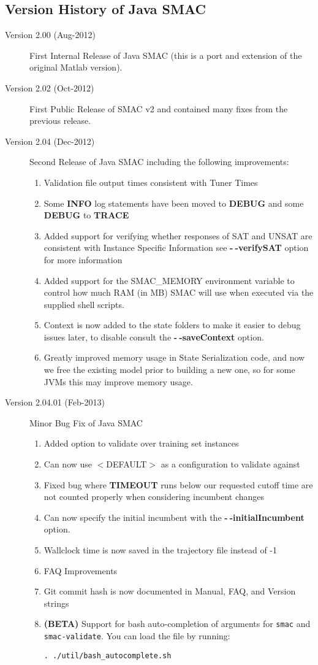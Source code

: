 \documentclass[11pt,letterpaper,oneside]{article}
\begin{document}
\subsection{Version History of Java SMAC}
	\begin{description}
		\item[Version 2.00 (Aug-2012)] First Internal Release of Java SMAC (this is a port and extension of the original Matlab version).
		\item[Version 2.02 (Oct-2012)] First Public Release of SMAC v2 and contained many fixes from the previous release.
		\item[Version 2.04 (Dec-2012)] Second Release of Java SMAC including the following improvements:
			\begin{enumerate}
			\item Validation file output times consistent with Tuner Times
			\item Some \textbf{INFO} log statements have been moved to \textbf{DEBUG} and some \textbf{DEBUG} to \textbf{TRACE}
			\item Added support for verifying whether responses of SAT and UNSAT are consistent with Instance Specific Information see \textbf{-$~\!$-verifySAT} option for more information
			\item Added support for the SMAC\_MEMORY environment variable to control how much RAM (in MB) SMAC will use when  executed via the supplied shell scripts. 
			\item Context is now added to the state folders to make it easier to debug issues later, to disable consult the \textbf{-$~\!$-saveContext} option.
			\item Greatly improved memory usage in State Serialization code, and now we free the existing model prior to building a new one, so for some JVMs this may improve memory usage.
			\end{enumerate}

			\item[Version 2.04.01 (Feb-2013)] Minor Bug Fix of Java SMAC
				\begin{enumerate}
 			\item Added option to validate over training set instances 
			\item Can now use $<$DEFAULT$>$ as a configuration to validate against
			\item Fixed bug where \textbf{TIMEOUT} runs below our requested cutoff time are not counted properly when considering incumbent changes
			\item Can now specify the initial incumbent with the \textbf{-$~\!$-initialIncumbent} option.
			\item Wallclock time is now saved in the trajectory file instead of -1
			\item FAQ Improvements
			\item Git commit hash is now documented in Manual, FAQ, and Version strings
			\item \textbf{(BETA)} Support for bash auto-completion of arguments for \texttt{smac} and \texttt{smac-validate}. You can load the file by running: 
\begin{verbatim}
. ./util/bash_autocomplete.sh
\end{verbatim}


\end{enumerate}
\end{description}
\end{document}
